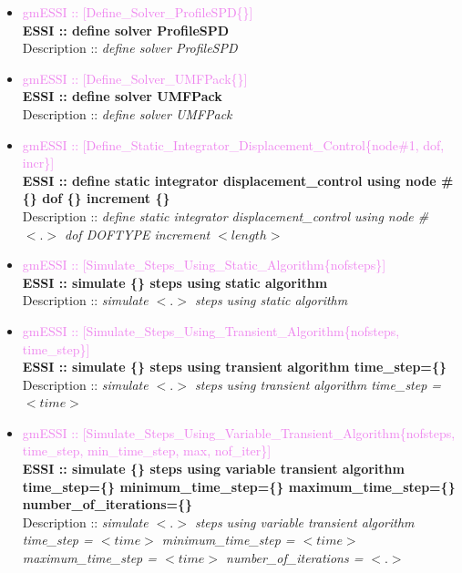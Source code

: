 \documentclass[11pt]{article}
\begin{document}
\begin{itemize}
      \item \textcolor{violet} {gmESSI :: [Define\_Solver\_ProfileSPD\{\}]}\\
      \textbf{ESSI :: define solver ProfileSPD}\\
      Description :: \textit{define solver ProfileSPD}

      \item \textcolor{violet} {gmESSI :: [Define\_Solver\_UMFPack\{\}]}\\
      \textbf{ESSI :: define solver UMFPack}\\
      Description :: \textit{define solver UMFPack}

      \item \textcolor{violet} {gmESSI :: [Define\_Static\_Integrator\_Displacement\_Control\{node\#1, dof, incr\}]}\\
      \textbf{ESSI :: define static integrator displacement\_control using node \#\{\}  dof \{\} increment \{\} }\\
      Description :: \textit{define static integrator displacement\_control using node \# $<.>$ dof DOFTYPE increment $<length>$}

      \item \textcolor{violet} {gmESSI :: [Simulate\_Steps\_Using\_Static\_Algorithm\{nofsteps\}]}\\
      \textbf{ESSI :: simulate \{\} steps using static algorithm}\\
      Description :: \textit{simulate $<.>$ steps using static algorithm}

      \item \textcolor{violet} {gmESSI :: [Simulate\_Steps\_Using\_Transient\_Algorithm\{nofsteps, time\_step\}]}\\
      \textbf{ESSI :: simulate \{\} steps using transient algorithm time\_step=\{\} }\\
      Description :: \textit{simulate $<.>$ steps using transient algorithm time\_step = $<time>$}

      \item \textcolor{violet} {gmESSI :: [Simulate\_Steps\_Using\_Variable\_Transient\_Algorithm\{nofsteps, time\_step, min\_time\_step, max, nof\_iter\}]}\\
      \textbf{ESSI :: simulate \{\} steps using variable transient algorithm time\_step=\{\} minimum\_time\_step=\{\} maximum\_time\_step=\{\} number\_of\_iterations=\{\}}\\
      Description :: \textit{simulate $<.>$ steps using variable transient algorithm time\_step = $<time>$ minimum\_time\_step = $<time>$ maximum\_time\_step = $<time>$ number\_of\_iterations = $<.>$}


\end{itemize}
\end{document}
